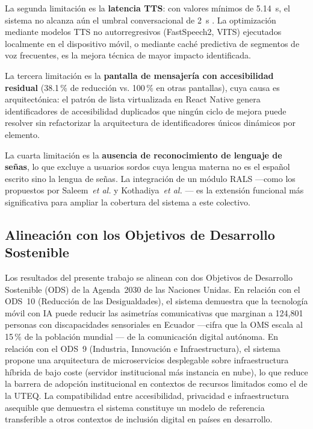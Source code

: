 \documentclass[journal]{IEEEtran}
\begin{document}
	La segunda limitaci\'on es la \textbf{latencia TTS}: con valores m\'inimos de 5.14~s, el sistema no alcanza a\'un el umbral conversacional de 2~s \cite{tan2021}. La optimizaci\'on mediante modelos TTS no autorregresivos (FastSpeech2, VITS) ejecutados localmente en el dispositivo m\'ovil, o mediante cach\'e predictiva de segmentos de voz frecuentes, es la mejora t\'ecnica de mayor impacto identificada.
	
	La tercera limitaci\'on es la \textbf{pantalla de mensajer\'ia con accesibilidad residual} (38.1\,\% de reducci\'on vs. 100\,\% en otras pantallas), cuya causa es arquitect\'onica: el patr\'on de lista virtualizada en React Native genera identificadores de accesibilidad duplicados que ning\'un ciclo de mejora puede resolver sin refactorizar la arquitectura de identificadores \'unicos din\'amicos por elemento.
	
	La cuarta limitaci\'on es la \textbf{ausencia de reconocimiento de lenguaje de se\~nas}, lo que excluye a usuarios sordos cuya lengua materna no es el espa\~nol escrito sino la lengua de se\~nas. La integraci\'on de un m\'odulo RALS ---como los propuestos por Saleem~\textit{et al.} \cite{saleem2023} y Kothadiya~\textit{et al.} \cite{kothadiya2022}--- es la extensi\'on funcional m\'as significativa para ampliar la cobertura del sistema a este colectivo.
	
	\subsection{Alineaci\'on con los Objetivos de Desarrollo Sostenible}
	Los resultados del presente trabajo se alinean con dos Objetivos de Desarrollo Sostenible (ODS) de la Agenda~2030 de las Naciones Unidas. En relaci\'on con el ODS~10 (Reducci\'on de las Desigualdades), el sistema demuestra que la tecnolog\'ia m\'ovil con IA puede reducir las asimetr\'ias comunicativas que marginan a 124{,}801 personas con discapacidades sensoriales en Ecuador ---cifra que la OMS escala al 15\,\% de la poblaci\'on mundial \cite{who2011}--- de la comunicaci\'on digital aut\'onoma. En relaci\'on con el ODS~9 (Industria, Innovaci\'on e Infraestructura), el sistema propone una arquitectura de microservicios desplegable sobre infraestructura h\'ibrida de bajo coste (servidor institucional m\'as instancia en nube), lo que reduce la barrera de adopci\'on institucional en contextos de recursos limitados como el de la UTEQ. La compatibilidad entre accesibilidad, privacidad e infraestructura asequible que demuestra el sistema constituye un modelo de referencia transferible a otros contextos de inclusi\'on digital en pa\'ises en desarrollo.
	
\end{document}
